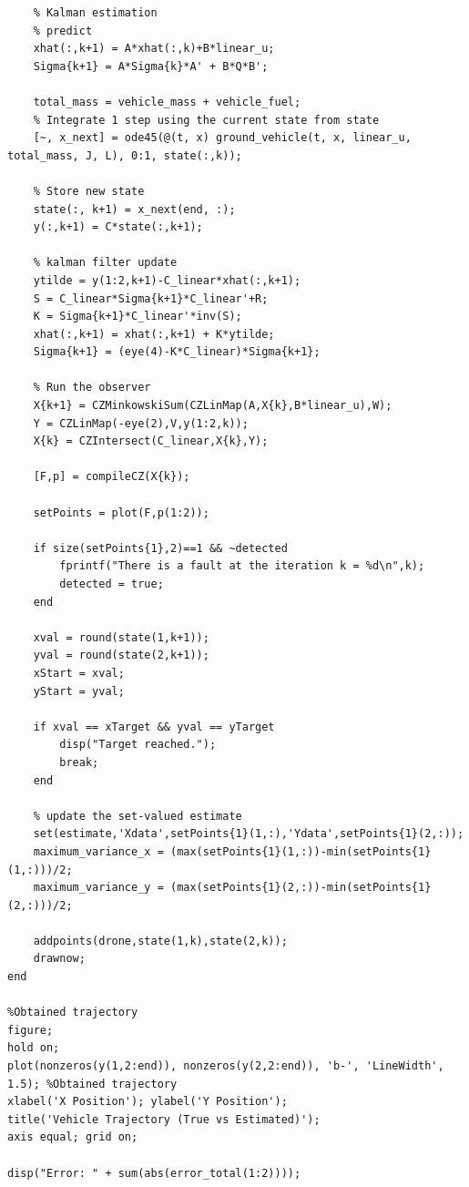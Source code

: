 \documentclass[12pt]{article}
\begin{document}
\begin{lstlisting}
    % Kalman estimation
    % predict
    xhat(:,k+1) = A*xhat(:,k)+B*linear_u;
    Sigma{k+1} = A*Sigma{k}*A' + B*Q*B';

    total_mass = vehicle_mass + vehicle_fuel;
    % Integrate 1 step using the current state from state
    [~, x_next] = ode45(@(t, x) ground_vehicle(t, x, linear_u, total_mass, J, L), 0:1, state(:,k));

    % Store new state   
    state(:, k+1) = x_next(end, :);
    y(:,k+1) = C*state(:,k+1);
    
    % kalman filter update 
    ytilde = y(1:2,k+1)-C_linear*xhat(:,k+1);
    S = C_linear*Sigma{k+1}*C_linear'+R;
    K = Sigma{k+1}*C_linear'*inv(S);
    xhat(:,k+1) = xhat(:,k+1) + K*ytilde;
    Sigma{k+1} = (eye(4)-K*C_linear)*Sigma{k+1};
    
    % Run the observer
    X{k+1} = CZMinkowskiSum(CZLinMap(A,X{k},B*linear_u),W);
    Y = CZLinMap(-eye(2),V,y(1:2,k));
    X{k} = CZIntersect(C_linear,X{k},Y);

    [F,p] = compileCZ(X{k});

    setPoints = plot(F,p(1:2));

    if size(setPoints{1},2)==1 && ~detected
        fprintf("There is a fault at the iteration k = %d\n",k);
        detected = true;
    end
    
    xval = round(state(1,k+1));
    yval = round(state(2,k+1));
    xStart = xval;
    yStart = yval;

    if xval == xTarget && yval == yTarget
        disp("Target reached.");
        break;
    end

    % update the set-valued estimate
    set(estimate,'Xdata',setPoints{1}(1,:),'Ydata',setPoints{1}(2,:));
    maximum_variance_x = (max(setPoints{1}(1,:))-min(setPoints{1}(1,:)))/2;
    maximum_variance_y = (max(setPoints{1}(2,:))-min(setPoints{1}(2,:)))/2;

    addpoints(drone,state(1,k),state(2,k));
    drawnow;
end

%Obtained trajectory
figure;
hold on;
plot(nonzeros(y(1,2:end)), nonzeros(y(2,2:end)), 'b-', 'LineWidth', 1.5); %Obtained trajectory
xlabel('X Position'); ylabel('Y Position');
title('Vehicle Trajectory (True vs Estimated)');
axis equal; grid on;

disp("Error: " + sum(abs(error_total(1:2))));
\end{lstlisting}
\end{document}
